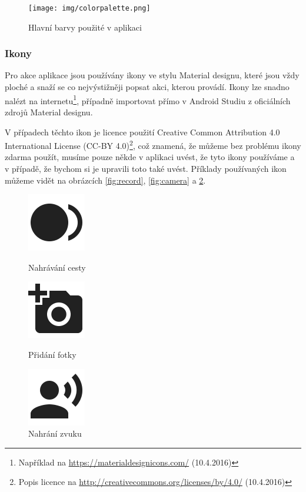\documentclass[czech,master,public,dept460,male,java,cpdeclaration]{diploma}
\begin{document}
  \begin{figure}[H]
          \centering
                  \texttt{[image: img/colorpalette.png]}
          \caption{Hlavní barvy použité v aplikaci}
          \label{fig:colorpalette}
  \end{figure}

\subsubsection{Ikony}
Pro akce aplikace jsou používány ikony ve stylu Material designu, které jsou vždy ploché
a snaží se co nejvýstižněji popsat akci, kterou provádí. Ikony lze snadno nalézt
na internetu\footnote{Například na \url{https://materialdesignicons.com/} (10.4.2016)}, případně
importovat přímo v Android Studiu z oficiálních zdrojů Material designu.

V případech těchto ikon je licence použití Creative Common Attribution 4.0 International License
(CC-BY 4.0)\footnote{Popis licence na \url{http://creativecommons.org/licenses/by/4.0/} (10.4.2016)}, což znamená,
že můžeme bez problému ikony zdarma použít, musíme pouze někde v aplikaci uvést, že tyto ikony
používáme a v případě, že bychom si je upravili toto také uvést.
Příklady používaných ikon můžeme vidět na obrázcích \ref{fig:record}, \ref{fig:camera} a \ref{fig:recordsound}.

\begin{figure}[H]
  \centering
  \includegraphics[scale=0.2]{img/record.png}
  \caption{Nahrávání cesty}\label{fig:record}
\endminipage\hfill
{}
  \centering
  \includegraphics[scale=0.2]{img/camera.png}
  \caption{Přidání fotky}\label{fig:camera}
\endminipage\hfill
{}%
  \centering
  \includegraphics[scale=0.2]{img/recordsound.png}
  \caption{Nahrání zvuku}\label{fig:recordsound}
\endminipage
\end{figure}
\end{document}
